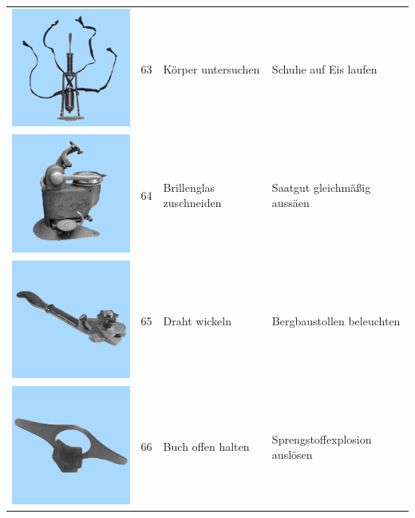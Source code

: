 \documentclass[
  english,
  doc,12pt,twoside,floatsintext]{apa7}
\begin{document}
\begin{center}
\begin{ThreePartTable}
\begin{longtable}{llll}
\includegraphics[valign=c, scale=0.19]{../materials/unfamiliar/63.png} & 63 & Körper untersuchen & Schuhe auf Eis laufen\\
\includegraphics[valign=c, scale=0.19]{../materials/unfamiliar/64.png} & 64 & Brillenglas zuschneiden & Saatgut gleichmäßig aussäen\\
\includegraphics[valign=c, scale=0.19]{../materials/unfamiliar/65.png} & 65 & Draht wickeln & Bergbaustollen beleuchten\\
\includegraphics[valign=c, scale=0.19]{../materials/unfamiliar/66.png} & 66 & Buch offen halten & Sprengstoffexplosion auslösen\\

\end{longtable}
\end{ThreePartTable}
\end{center}
\end{document}
